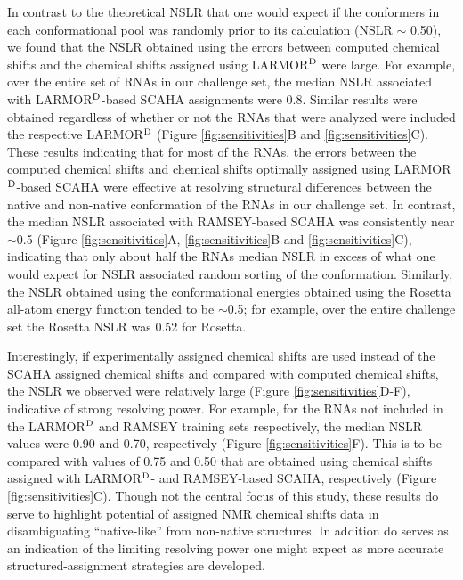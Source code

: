\documentclass[journal=jcisd8,manuscript=article,layout=onecolumn]{achemso}
\begin{document}
In contrast to the theoretical NSLR that one would expect if the conformers in each conformational pool was randomly prior to its calculation (NSLR $\sim$ 0.50), we found that the NSLR obtained using the errors between computed chemical shifts and the chemical shifts assigned using LARMOR$^{\rm D}$ were large. For example, over the entire set of RNAs in our challenge set, the median NSLR associated with LARMOR$^{\rm D}$-based SCAHA assignments were 0.8. Similar results were obtained regardless of whether or not the RNAs that were analyzed were included the respective LARMOR$^{\rm D}$ (Figure \ref{fig:sensitivities}B and \ref{fig:sensitivities}C).  These results indicating that for most of the RNAs, the errors between the computed chemical shifts and  chemical shifts optimally assigned using LARMOR$^{\rm D}$-based SCAHA were effective at resolving structural differences between the native and non-native conformation of the RNAs in our challenge set.  In contrast, the median NSLR associated with RAMSEY-based SCAHA was consistently near $\sim$0.5 (Figure  \ref{fig:sensitivities}A, \ref{fig:sensitivities}B and \ref{fig:sensitivities}C), indicating that only about half the RNAs median NSLR in excess of what one would expect for NSLR associated random sorting of the conformation. Similarly, the NSLR obtained using the conformational energies obtained using the Rosetta all-atom energy function\cite{alford2017rosetta} tended to be $\sim$0.5; for example, over the entire challenge set the Rosetta NSLR was 0.52 for Rosetta.

Interestingly, if experimentally assigned chemical shifts are used instead of the SCAHA assigned chemical shifts and compared with computed chemical shifts, the NSLR we observed were relatively large (Figure  \ref{fig:sensitivities}D-F), indicative of strong resolving power. For example, for the RNAs not included in the LARMOR$^{\rm D}$ and RAMSEY training sets respectively, the median NSLR values were 0.90 and 0.70, respectively (Figure  \ref{fig:sensitivities}F). This is to be compared with values of 0.75 and 0.50 that are obtained using chemical shifts assigned with LARMOR$^{\rm D}$- and RAMSEY-based SCAHA, respectively (Figure  \ref{fig:sensitivities}C). Though not the central focus of this study, these results do serve to highlight potential of assigned NMR chemical shifts data in disambiguating ``native-like'' from non-native structures. In addition do serves as an indication of the limiting resolving power one might expect as more accurate structured-assignment strategies are developed.
\end{document}
